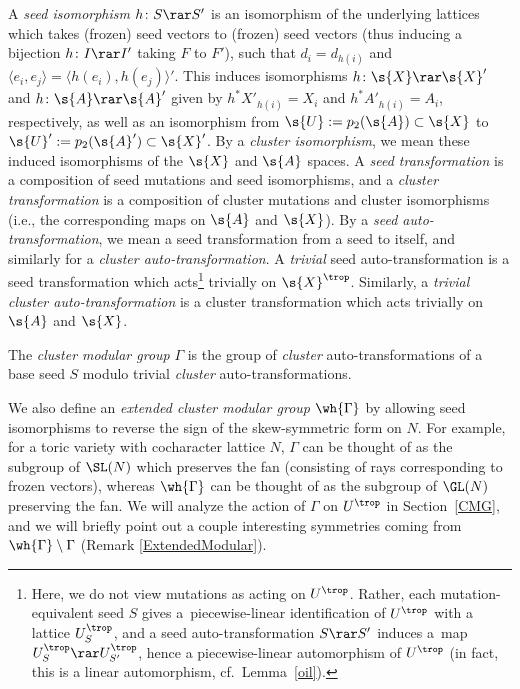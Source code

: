 A {\it seed isomorphism} $h\colon S\rar S'$ is an isomorphism of the underlying lattices which takes (frozen) seed vectors to (frozen) seed vectors (thus inducing a bijection $h\colon I\rar I'$ taking $F$ to $F'$), such that $d_i=d_{h(i)}$ and $\langle e_i,e_j\rangle = \langle h(e_i),h(e_j)\rangle'$. This induces isomorphisms $h\colon \s{X}\rar \s{X}'$ and $h\colon \s{A}\rar \s{A}'$ given by
	$h^{*}X'_{h(i)} = X_{i}$ and $h^{*}A'_{h(i)} = A_{i}$, respectively, as well as an isomorphism from $\s{U}:=p_2(\s{A})\subset \s{X}$ to $\s{U}':=p_2(\s{A}') \subset \s{X}'$. By a \textit{cluster isomorphism}, we mean these induced isomorphisms of the $\s{X}$ and $\s{A}$ spaces. A {\it seed transformation} is a composition of seed mutations and seed isomorphisms, and a {\it cluster transformation} is a composition of cluster mutations and cluster isomorphisms (i.e., the corresponding maps on $\s{A}$ and $\s{X}$). By a {\it seed auto-transformation}, we mean a seed transformation from a seed to itself, and similarly for a \textit{cluster auto-transformation}. A {\it trivial} seed auto-transformation is a seed transformation which acts\footnote{Here, we do not view mutations as acting on $U^{\trop}$. Rather, each mutation-equivalent seed $S$ gives a~piecewise-linear identification of $U^{\trop}$ with a lattice $U_S^{\trop}$, and a seed auto-transformation $S\rar S'$ induces a~map \mbox{$U_S^{\trop}\rar U_{S'}^{\trop}$}, hence a piecewise-linear automorphism of $U^{\trop}$ (in fact, this is a linear automorphism, cf.\ Lemma~\ref{oil}).} trivially on $\s{X}^{\trop}$. Similarly, a \textit{trivial cluster auto-transformation} is a cluster transformation which acts trivially on $\s{A}$ and $\s{X}$.
	
\begin{dfn}[\cite{FG1}]The {\it cluster modular group} $\Gamma$ is the group of {\it cluster} auto-transformations of a base seed $S$ modulo trivial {\it cluster} auto-transformations.
\end{dfn}

We also define an {\it extended cluster modular group} $\wh{\Gamma}$ by allowing seed isomorphisms to reverse the sign of the skew-symmetric form on $N$. For example, for a toric variety with cocharacter lattice $N$, $\Gamma$ can be thought of as the subgroup of $\SL(N)$ which preserves the fan (consisting of rays corresponding to frozen vectors), whereas $\wh{\Gamma}$ can be thought of as the subgroup of $\GL(N)$ preserving the fan. We will analyze the action of $\Gamma$ on $U^{\trop}$ in Section~\ref{CMG}, and we will briefly point out a couple interesting symmetries coming from $\wh{\Gamma}\setminus \Gamma$ (Remark \ref{ExtendedModular}).

